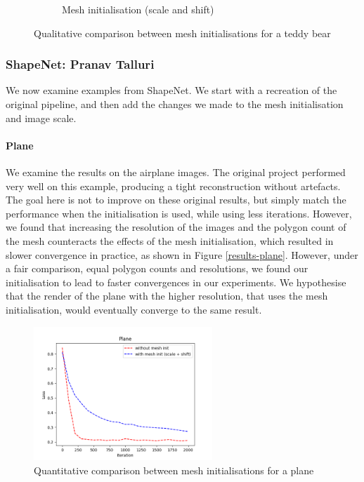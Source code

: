 \documentclass{article}
\begin{document}
\begin{figure}[h!]
\begin{subfigure}{.3\textwidth}
    \caption{Mesh initialisation (scale and shift)}
    \label{results-teddy-mesh2}
  \end{subfigure}
  \caption{Qualitative comparison between mesh initialisations for a teddy bear}
  \label{results-teddy}
\end{figure}

\newpage
\subsubsection{ShapeNet: Pranav Talluri}

We now examine examples from ShapeNet. We start with a recreation of the original pipeline, and then add the changes we made to the mesh initialisation and image scale.

\paragraph{Plane}
We examine the results on the airplane images. The original project performed very well on this example, producing a tight reconstruction without artefacts. The goal here is not to improve on these original results, but simply match the performance when the initialisation is used, while using less iterations. However, we found that increasing the resolution of the images and the polygon count of the mesh counteracts the effects of the mesh initialisation, which resulted in slower convergence in practice, as shown in Figure \ref{results-plane}. However, under a fair comparison, equal polygon counts and resolutions, we found our initialisation to lead to faster convergences in our experiments. We hypothesise that the render of the plane with the higher resolution, that uses the mesh initialisation, would eventually converge to the same result.

\begin{figure}[h!]
  \centering
  \includegraphics[width=0.6\textwidth]{images/planeplot.png}
  \caption{Quantitative comparison between mesh initialisations for a plane}
  \label{results-plane-loss}
\end{figure}
\end{document}
